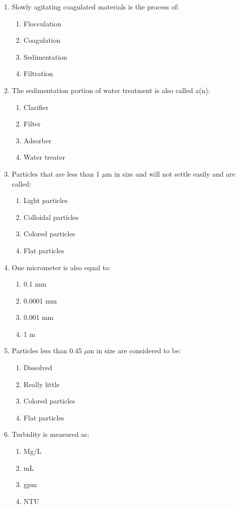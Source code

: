 \documentclass[10pt]{article}
\begin{document}
\begin{enumerate}
\begin{enumerate}
\item Slowly agitating coagulated materials is the process of:
\begin{enumerate}
\item Flocculation
\item Coagulation
\item Sedimentation
\item Filtration
\end{enumerate}

\item The sedimentation portion of water treatment is also called a(n):
\begin{enumerate}
\item Clarifier
\item Filter
\item Adsorber
\item Water treater
\end{enumerate}

\item Particles that are less than 1 $\mu\text{m}$ in size and will not settle easily and are called:
\begin{enumerate}
\item Light particles
\item Colloidal particles
\item Colored particles
\item Flat particles
\end{enumerate}

\item One micrometer is also equal to:
\begin{enumerate}
\item 0.1 mm
\item 0.0001 mm
\item 0.001 mm
\item 1 m
\end{enumerate}

\item Particles less than 0.45 $\mu\text{m}$ in size are considered to be:
\begin{enumerate}
\item Dissolved
\item Really little
\item Colored particles
\item Flat particles
\end{enumerate}

\item Turbidity is measured as:
\begin{enumerate}
\item Mg/L
\item mL
\item gpm
\item NTU
\end{enumerate}


\end{enumerate}
\end{enumerate}
\end{document}
